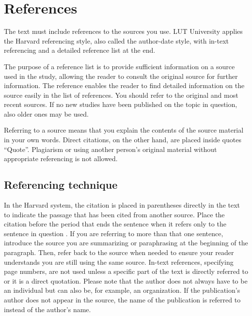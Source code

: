 \section{References}\label{App:B}

The text must include references to the sources you use. LUT University applies the Harvard referencing style, also called the author-date style, with in-text referencing and a detailed reference list at the end.

The purpose of a reference list is to provide sufficient information on a source used in the study, allowing the reader to consult the original source for further information. The reference enables the reader to find detailed information on the source easily in the list of references. You should refer to the original and most recent sources. If no new studies have been published on the topic in question, also older ones may be used.

Referring to a source means that you explain the contents of the source material in your own words. Direct citations, on the other hand, are placed inside quotes \enquote{Quote}. Plagiarism or using another person’s original material without appropriate referencing is not allowed.

\subsection*{Referencing technique}

In the Harvard system, the citation is placed in parentheses directly in the text to indicate the passage that has been cited from another source. Place the citation before the period that ends the sentence when it refers only to the sentence in question \citep{CitekeyInbook2}. If you are referring to more than that one sentence, introduce the source you are summarizing or paraphrasing at the beginning of the paragraph. Then, refer back to the source when needed to ensure your reader understands you are still using the same source. In-text references, specifying page numbers, are not used unless a specific part of the text is directly referred to or it is a direct quotation. Please note that the author does not always have to be an individual but can also be, for example, an organization. If the publication's author does not appear in the source, the name of the publication is referred to instead of the author's name.


